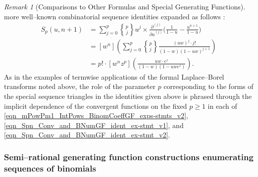 \documentclass[12pt,reqno]{article}
\numberwithin{sfootnote}{section}
\numberwithin{equation}{section}
\theoremstyle{plain}
\theoremstyle{definition}
\theoremstyle{remark}
\newtheorem{remark}[theorem]{Remark}
\newcommand{\gkpSII}[2]{\ensuremath{\genfrac{\{}{\}}{0pt}{}{#1}{#2}}}
\begin{document}
\begin{remark}[Comparisons to Other Formulas and Special Generating Functions]
more well--known combinatorial sequence identities expanded as follows 
\citep[\S 26.8]{NISTHB} \citep[\S 7.4]{GKP}: 
\begin{align*} 
S_p(u, n+1) & = 
     \sum_{j=0}^{p} \gkpSII{p}{j} u^{j} \times 
     \frac{\partial^{(j)}}{{\partial u}^{(j)}} 
     \Biggl( 
     \frac{1}{1-u} - \frac{u^{n+1}}{1-u} 
     \Biggr) \\ 
   & = 
     [w^{n}] \left( 
     \sum_{j=0}^{p} \gkpSII{p}{j} \frac{(uw)^{j} \cdot j!}{(1-w) (1-uw)^{j+1}} 
     \right) \\ 
   & = 
     p! \cdot [w^{n} z^{p}] \left( 
     \frac{uw \cdot e^{z}}{(1-w) (1 - uw e^{z})} 
     \right). 
\end{align*} 
As in the examples of termwise applications of the formal 
Laplace--Borel transforms noted above, 
the role of the parameter $p$ corresponding to the forms of the 
special sequence triangles in the identities given above is 
phrased through the implicit dependence of the convergent functions on the 
fixed $p \geq 1$ in each of 
\eqref{eqn_mPowPm1_IntPows_BinomCoeffGF_exps-stmts_v2}, 
\eqref{eqn_Spn_Conv_and_BNumGF_ident_ex-stmt_v1}, and 
\eqref{eqn_Spn_Conv_and_BNumGF_ident_ex-stmt_v2}. 
\end{remark} 

\subsubsection{Semi--rational generating function constructions 
               enumerating sequences of binomials} 
\end{document}
